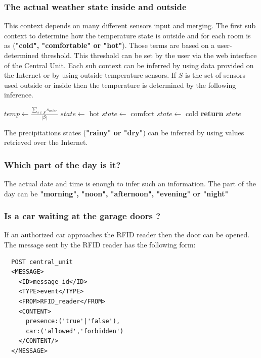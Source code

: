 \documentclass{acm_proc_article-sp}
\begin{document}
 \subsubsection*{The actual weather state inside and outside}
 This context depends on many different sensors input and merging.
 The first sub context to determine how the temperature state is outside and for each room is as (\textbf{"cold", "comfortable" or "hot"}). 
 Those terms are based on a user-determined threshold. This threshold can be set by the user via the web interface of the Central Unit.
 Each sub context can be inferred by using data provided on the Internet or by using outside temperature sensors.
 If $S$ is the set of sensors used outside or inside then the temperature is determined by the following inference.
 \begin{description}
 \begin{algorithm}
  \begin{algorithmic}
  \State $temp\gets \frac{\underset{s \in S}{\sum} s_{value}}{|S|}$
    \State $state\gets$ hot
    \State $state\gets$ comfort
    \State $state\gets$ cold
   \EndIf
  \State \textbf{return} $state$
  \end{algorithmic}
  \end{algorithm}
  \end{description}
 The precipitations states (\textbf{"rainy" or "dry"}) can be inferred by using values retrieved over the Internet.
  \subsubsection*{Which part of the day is it?}
  The actual date and time is enough to infer such an information.
  The part of the day can be \textbf{"morning", "noon", "afternoon", "evening" or "night"}
 \subsubsection*{Is a car waiting at the garage doors ?}
 If an authorized car approaches the RFID reader then the door can be opened.
 The message sent by the RFID reader has the following form:
 
  \begin{minipage}{\linewidth}
\begin{lstlisting}
  POST central_unit 
  <MESSAGE>
    <ID>message_id</ID>
    <TYPE>event</TYPE>
    <FROM>RFID_reader</FROM>
    <CONTENT>
      presence:('true'|'false'),
      car:('allowed','forbidden')
    </CONTENT/>
  </MESSAGE> 
\end{lstlisting}
\end{minipage}
\end{document}
